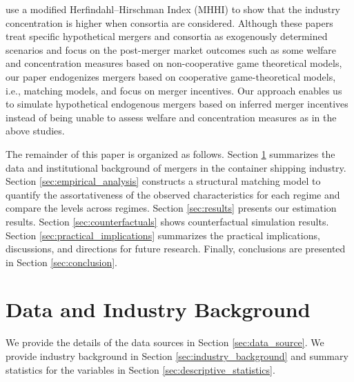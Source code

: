 \documentclass[10pt]{article}
\begin{document}
\cite{Merk2022MEL} use a modified Herfindahl–Hirschman Index (MHHI) to show that the industry concentration is higher when consortia are considered.
Although these papers treat specific hypothetical mergers and consortia as exogenously determined scenarios and focus on the post-merger market outcomes such as some welfare and concentration measures based on non-cooperative game theoretical models, our paper endogenizes mergers based on cooperative game-theoretical models, i.e., matching models, and focus on merger incentives. 
Our approach enables us to simulate hypothetical endogenous mergers based on inferred merger incentives instead of being unable to assess welfare and concentration measures as in the above studies.

The remainder of this paper is organized as follows. 
Section \ref{sec:data_and_institutional_background} summarizes the data and institutional background of mergers in the container shipping industry.
Section \ref{sec:empirical_analysis} constructs a structural matching model to quantify the assortativeness of the observed characteristics for each regime and compare the levels across regimes.
Section \ref{sec:results} presents our estimation results.
Section \ref{sec:counterfactuals} shows counterfactual simulation results.
Section \ref{sec:practical_implications} summarizes the practical implications, discussions, and directions for future research.
Finally, conclusions are presented in Section \ref{sec:conclusion}.


\section{Data and Industry Background}\label{sec:data_and_institutional_background}
We provide the details of the data sources in Section \ref{sec:data_source}. 
We provide industry background in
Section \ref{sec:industry_background} and summary statistics for the variables in Section \ref{sec:descriptive_statistics}.
\end{document}
